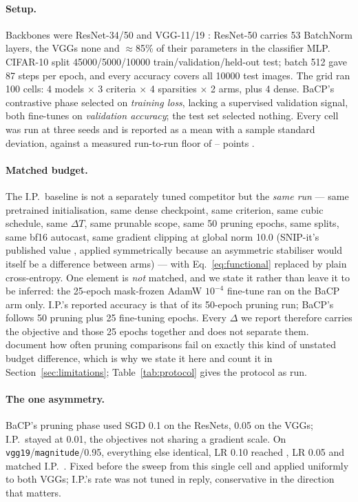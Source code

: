 \paragraph{Setup.}
Backbones were ResNet-34/50 \citep{he2016deep} and VGG-11/19
\citep{simonyan2015very}: ResNet-50 carries 53 BatchNorm layers, the VGGs none
and $\approx$85\% of their parameters in the classifier MLP. CIFAR-10
\citep{krizhevsky2009cifar} split \num{45000}/\num{5000}/\num{10000}
train/validation/held-out test; batch 512 gave 87 steps per epoch, and every
accuracy covers all \num{10000} test images. The grid ran 100 cells: 4 models
$\times$ 3 criteria $\times$ 4 sparsities $\times$ 2 arms, plus 4 dense.
BaCP's contrastive phase selected on \emph{training loss}, lacking a
supervised validation signal, both fine-tunes on \emph{validation accuracy};
the test set selected nothing. Every cell was run at three seeds and is
reported as a mean with a sample standard deviation, against a measured
run-to-run floor of --%
 points \citep{bouthillier2021variance}.

\paragraph{Matched budget.}
The I.P.\ baseline is not a separately tuned competitor but the \emph{same run}
--- same pretrained initialisation, same dense checkpoint, same criterion, same
cubic schedule, same $\Delta T$, same prunable scope, same 50 pruning epochs, same splits,
same bf16 autocast, same gradient clipping at global norm 10.0 (SNIP-it's
published value \citep{verdenius2020snipit}, applied symmetrically because an
asymmetric stabiliser would itself be a difference between arms) --- with
Eq.~\eqref{eq:functional} replaced by plain cross-entropy. One element is
\emph{not} matched, and we state it rather than leave it to be inferred: the
25-epoch mask-frozen AdamW $10^{-4}$ fine-tune \citep{loshchilov2019adamw} ran
on the BaCP arm only. I.P.'s reported accuracy is that of its 50-epoch pruning
run; BaCP's follows 50 pruning plus 25 fine-tuning epochs. Every $\Delta$ we
report therefore carries the objective and those 25 epochs together and does
not separate them. \citet{blalock2020state} document how often pruning
comparisons fail on exactly this kind of unstated budget difference, which is
why we state it here and count it in Section~\ref{sec:limitations};
Table~\ref{tab:protocol} gives the protocol as run.

\paragraph{The one asymmetry.}
\label{sec:experiments:vgglr}
BaCP's pruning phase used SGD 0.1 on the ResNets, 0.05 on the VGGs; I.P.\ stayed
at 0.01, the objectives not sharing a gradient scale. On
\texttt{vgg19}/\texttt{magnitude}/0.95, everything else identical, LR 0.10
reached , LR 0.05
 and matched I.P.\
. Fixed before the sweep from this single
cell and applied uniformly to both VGGs; I.P.'s rate was not tuned in reply,
conservative in the direction that matters.

